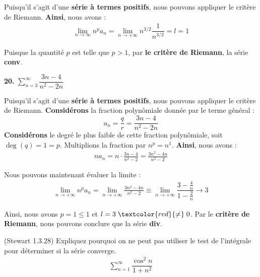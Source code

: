 \documentclass{report}
\begin{document}
    Puisqu'il s'agit d'une \textbf{série à termes positifs}, nous pouvons appliquer le critère de Riemann. 
    \textbf{Ainsi}, nous avons :
    \begin{align*}
        \lim\limits_{n\to \infty}n^pa_n = \lim\limits_{n \to+\infty }n^{3/2}\dfrac{1}{n^{3/2}} = l = 1  
    \end{align*}

    Puisque la quantité $p$ est telle que $p > 1$, par \textbf{le critère de Riemann}, la série \textcolor{myb}{\textbf{conv}}. 

    \vspace{1em}
    \noindent 
    \textbf{20.} $\sum_{n=3}^{\infty }\dfrac{3n - 4}{n^2 -2n}$

    \vspace{1em}
    Puisqu'il s'agit d'une \textbf{série à termes positifs}, nous pouvons appliquer le 
    critère de Riemann. 
    \textbf{Considérons} la fraction polynômiale donnée 
    par le terme général :
    $$a_n = \dfrac{q}{r} = \frac{3n -4}{n^2 -2n} $$  
    \textbf{Considérons} le degré le plus faible de cette 
    fraction polynômiale, soit $\deg(q) = 1 = p$. Multiplions la fraction par 
    $n^p = n^1$.
    \textbf{Ainsi}, nous avons :
    \begin{align*}
        n a_n = n \cdot \frac{3n -4}{n^2 -2} = \frac{3n^2 -4n}{n^2 -2}  
    \end{align*}

    Nous pouvons maintenant évaluer la limite :
    \begin{align*}
        \lim\limits_{n \to+\infty }n^pa_n = 
        \lim\limits_{n \to+\infty }\frac{3n^2 -4n}{n^2 -2}  
        \equiv
        \lim\limits_{n \to+\infty } \dfrac{3 - \frac{4}{n} }{1 - \frac{2}{n}} 
        \longrightarrow 3
    \end{align*}

    Ainsi, nous avons $p = 1 \leq 1$ et $l = 3 \; \textcolor{red}{ \neq } \; 0 $.
    Par le \textbf{critère de Riemann}, nous pouvons conclure que la série 
    \textcolor{myr}{\textbf{div}}.


    \begin{Exercice}{(Stewart 1.3.28)}{}
        Expliquez pourquoi on ne peut pas utiliser le test de l'intégrale pour
        déterminer si la série converge. 
        \begin{align*}
            \sum_{n=1}^{\infty }\dfrac{\cos^2n}{1 + n^2}
        \end{align*}
    \end{Exercice}
\end{document}
